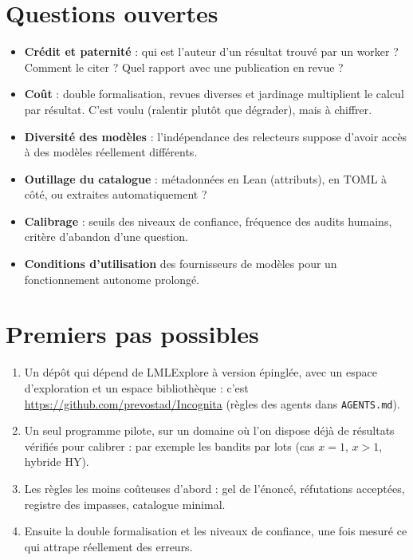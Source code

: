 \documentclass[11pt,a4paper]{article}
\newcommand{\lmlx}{\textsf{LMLExplore}}
\begin{document}
\section{Questions ouvertes}

\begin{ouvert}
\begin{itemize}
\item \textbf{Crédit et paternité} : qui est l'auteur d'un résultat trouvé par un worker ? Comment le
  citer ? Quel rapport avec une publication en revue ?
\item \textbf{Coût} : double formalisation, revues diverses et jardinage multiplient le calcul par
  résultat. C'est voulu (ralentir plutôt que dégrader), mais à chiffrer.
\item \textbf{Diversité des modèles} : l'indépendance des relecteurs suppose d'avoir accès à des modèles
  réellement différents.
\item \textbf{Outillage du catalogue} : métadonnées en Lean (attributs), en TOML à côté, ou extraites
  automatiquement ?
\item \textbf{Calibrage} : seuils des niveaux de confiance, fréquence des audits humains, critère
  d'abandon d'une question.
\item \textbf{Conditions d'utilisation} des fournisseurs de modèles pour un fonctionnement autonome
  prolongé.
\end{itemize}
\end{ouvert}

\section{Premiers pas possibles}

\begin{enumerate}
\item Un dépôt qui dépend de \lmlx{} à version épinglée, avec un espace d'exploration et un espace
  bibliothèque : c'est \url{https://github.com/prevostad/Incognita} (règles des agents dans
  \texttt{AGENTS.md}).
\item Un seul programme pilote, sur un domaine où l'on dispose déjà de résultats vérifiés pour calibrer :
  par exemple les bandits par lots (cas $x=1$, $x>1$, hybride HY).
\item Les règles les moins coûteuses d'abord : gel de l'énoncé, réfutations acceptées, registre des
  impasses, catalogue minimal.
\item Ensuite la double formalisation et les niveaux de confiance, une fois mesuré ce qui attrape
  réellement des erreurs.
\end{enumerate}
\end{document}
